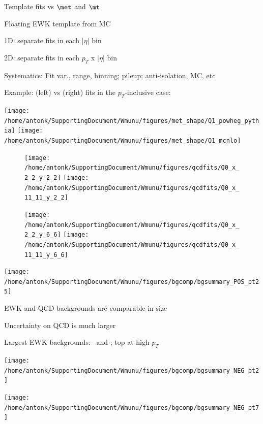 {
\iteb
\item Template fits vs $\met$ and $\mt$
\item Floating EWK template from MC
\iteb
\item 1D: separate fits in each $|\eta|$ bin
\item 2D: separate fits in each $p_{T}$ x $|\eta|$ bin
\item Systematics: Fit var., range, binning; pileup; anti-isolation, MC, etc
\itee
\itee

\centering
\footnotesize{Example: \Powheg\Pythia (left) vs \Mcatnlo (right) fits in the $p_T$-inclusive case:}

\texttt{[image: /home/antonk/SupportingDocument/Wmunu/figures/met\_shape/Q1\_powheg\_pythia]}
\texttt{[image: /home/antonk/SupportingDocument/Wmunu/figures/met\_shape/Q1\_mcnlo]}

}


{
\begin{figure}[phtb]
  \begin{center}
      \texttt{[image: /home/antonk/SupportingDocument/Wmunu/figures/qcdfits/Q0\_x\_2\_2\_y\_2\_2]}
      \texttt{[image: /home/antonk/SupportingDocument/Wmunu/figures/qcdfits/Q0\_x\_11\_11\_y\_2\_2]}

      \texttt{[image: /home/antonk/SupportingDocument/Wmunu/figures/qcdfits/Q0\_x\_2\_2\_y\_6\_6]}
      \texttt{[image: /home/antonk/SupportingDocument/Wmunu/figures/qcdfits/Q0\_x\_11\_11\_y\_6\_6]}
  \end{center}
\end{figure}
}


{

\colb
{}

\centering
\texttt{[image: /home/antonk/SupportingDocument/Wmunu/figures/bgcomp/bgsummary\_POS\_pt25]}

\iteb
\item EWK and QCD backgrounds are comparable in size
\item Uncertainty on QCD is much larger
\item Largest EWK backgrounds: \Wtau\ and \Zmm; top at high $p_T$
\itee


\centering
\texttt{[image: /home/antonk/SupportingDocument/Wmunu/figures/bgcomp/bgsummary\_NEG\_pt2]}

\texttt{[image: /home/antonk/SupportingDocument/Wmunu/figures/bgcomp/bgsummary\_NEG\_pt7]}

\cole


}


